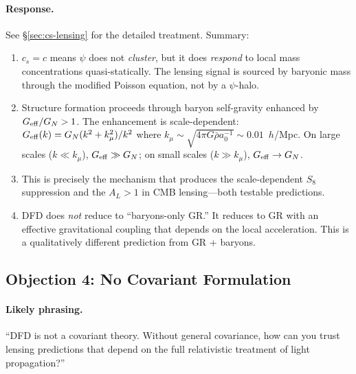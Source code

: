 \documentclass[11pt,a4paper]{article}
\newcommand{\Geff}{G_{\rm eff}}
\begin{document}
\paragraph{Response.}
See \S\ref{sec:cs-lensing} for the detailed treatment.  Summary:

\begin{enumerate}[label=(\alph*)]
\item $c_s = c$ means $\psi$ does not \emph{cluster}, but it does
  \emph{respond} to local mass concentrations quasi-statically.  The
  lensing signal is sourced by baryonic mass through the modified Poisson
  equation, not by a $\psi$-halo.

\item Structure formation proceeds through baryon self-gravity enhanced by
  $\Geff/G_N > 1$.  The enhancement is scale-dependent: $\Geff(k) =
  G_N(k^2 + k_\mu^2)/k^2$ where $k_\mu \sim \sqrt{4\pi G\bar{\rho}
  a_0^{-1}} \sim 0.01$~$h$/Mpc.  On large scales ($k \ll k_\mu$),
  $\Geff \gg G_N$; on small scales ($k \gg k_\mu$), $\Geff \to G_N$.

\item This is precisely the mechanism that produces the scale-dependent $S_8$
  suppression and the $A_L > 1$ in CMB lensing---both testable predictions.

\item DFD does \emph{not} reduce to ``baryons-only GR.''  It reduces to GR
  with an effective gravitational coupling that depends on the local
  acceleration.  This is a qualitatively different prediction from GR +
  baryons.
\end{enumerate}

\subsection{Objection 4: No Covariant Formulation}

\paragraph{Likely phrasing.}
``DFD is not a covariant theory. Without general covariance, how can you
trust lensing predictions that depend on the full relativistic treatment
of light propagation?''
\end{document}
